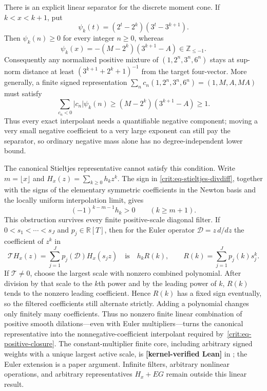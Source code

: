 \documentclass[11pt,oneside]{article}
\theoremstyle{definition}
\theoremstyle{remark}
\newcommand{\Z}{\mathbb Z}
\newcommand{\R}{\mathbb R}
\newcommand{\lean}[1]{\texttt{\detokenize{#1}}}
\newcommand{\statuslean}{\textcolor{leanblue}{\textbf{[kernel-verified Lean]}}}
\begin{document}
There is an explicit linear separator for the discrete moment cone.  If $k<x<k+1$, put
\begin{equation}
 \psi_k(t)=(2^t-2^k)(3^t-3^{k+1}).
 \label{crit:eq-moment-separator}
\end{equation}
Then $\psi_k(n)\ge0$ for every integer $n\ge0$, whereas
\begin{equation}
 \psi_k(x)=-(M-2^k)(3^{k+1}-A)\in\Z_{\le-1}.
 \label{crit:eq-integral-separation}
\end{equation}
Consequently any normalized positive mixture of
$(1,2^n,3^n,6^n)$ stays at sup-norm distance at least
$(3^{k+1}+2^k+1)^{-1}$ from the target four-vector.  More generally, a finite signed
representation $\sum_nc_n(1,2^n,3^n,6^n)=(1,M,A,MA)$ must satisfy
\begin{equation}
 \sum_{c_n<0}|c_n|\psi_k(n)
 \ge(M-2^k)(3^{k+1}-A)\ge1.
 \label{crit:eq-weighted-negativity}
\end{equation}
Thus every exact interpolant needs a quantifiable negative component; moving a very small
negative coefficient to a very large exponent can still pay the separator, so ordinary
negative mass alone has no degree-independent lower bound.

The canonical Stieltjes representative cannot satisfy this condition.  Write
$m=\lfloor x\rfloor$ and $H_x(z)=\sum_{k\ge0}h_kz^k$.  The sign in
\eqref{crit:eq-stieltjes-divdiff}, together with the signs of the elementary symmetric
coefficients in the Newton basis and the locally uniform interpolation limit, gives
\begin{equation}
 \boxed{(-1)^{k-m-1}h_k>0\qquad(k\ge m+1).}
 \label{crit:eq-alternating-tail}
\end{equation}
This obstruction survives every finite positive-scale diagonal filter.  If
$0<s_1<\cdots<s_J$ and $p_j\in\R[T]$, then for the Euler operator
$\mathcal D=z\,d/dz$ the coefficient of $z^k$ in
\begin{equation}
 \mathcal T H_x(z)=\sum_{j=1}^Jp_j(\mathcal D)H_x(s_jz)
 \quad\text{is}\quad
 h_kR(k),\qquad R(k)=\sum_{j=1}^Jp_j(k)s_j^k.
 \label{crit:eq-dilation-tail-filter}
\end{equation}
If $\mathcal T\ne0$, choose the largest scale with nonzero combined polynomial.  After
division by that scale to the $k$th power and by the leading power of $k$, $R(k)$ tends to
the nonzero leading coefficient.  Hence $R(k)$ has a fixed sign eventually, so the filtered
coefficients still alternate strictly.  Adding a polynomial changes only finitely many
coefficients.  Thus no nonzero finite linear combination of positive smooth dilations---even
with Euler multipliers---turns the canonical representative into the nonnegative-coefficient
interpolant required by~\eqref{crit:eq-positive-closure}.  The constant-multiplier finite
core, including arbitrary signed weights with a unique largest active scale, is
\statuslean{} in \lean{FiniteDilationAlternation}; the Euler extension is a paper argument.
Infinite filters, arbitrary nonlinear operations, and arbitrary representatives $H_x+EG$
remain outside this linear result.
\end{document}
